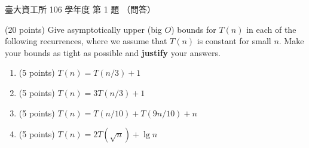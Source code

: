 \begin{pastexam}[label={px:ntu-106-dsa-01}]{臺大資工所 106 學年度 第 1 題}
（問答）

(20 points) Give asymptotically upper (big $O$) bounds for $T(n)$ in each of the following
recurrences, where we assume that $T(n)$ is constant for small $n$. Make your bounds as tight as
possible and \textbf{justify} your answers.
\begin{enumerate}[label=(\alph*)]
\item (5 points) $T(n)=T(n/3)+1$
\item (5 points) $T(n)=3T(n/3)+1$
\item (5 points) $T(n)=T(n/10)+T(9n/10)+n$
\item (5 points) $T(n)=2T(\sqrt{n})+\lg n$
\end{enumerate}
\end{pastexam}

